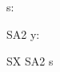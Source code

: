 \documentclass{article}
\begin{document}
\begin{zdirectives}
\end{zdirectives}

\begin{axdef}
  s: \power \nat
\end{axdef}
\begin{schema}{SA2}
  y: \nat
\end{schema}
\begin{schema}{SX}
  SA2 \land s
\end{schema}
\end{document}
